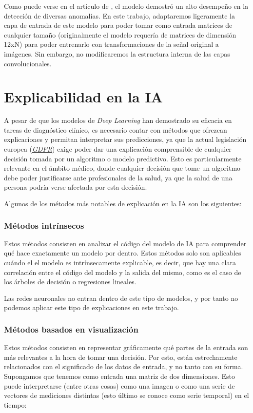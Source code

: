 Como puede verse en el artículo de \cite{ribeiro}, el modelo demostró un alto desempeño en la detección de diversas anomalías. En este trabajo, adaptaremos ligeramente la capa de entrada de este modelo para poder tomar como entrada matrices de cualquier tamaño (originalmente el modelo requería de matrices de dimensión 12xN) para poder entrenarlo con transformaciones de la señal original a imágenes. Sin embargo, no modificaremos la estructura interna de las capas convolucionales.

\section{Explicabilidad en la IA}
A pesar de que los modelos de \emph{Deep Learning} han demostrado su eficacia en tareas de diagnóstico clínico, es necesario contar con métodos que ofrezcan explicaciones y permitan interpretar sus predicciones, ya que la actual legislación europea (\href{https://europa.eu/youreurope/business/dealing-with-customers/data-protection/data-protection-gdpr/index_es.htm}{\emph{GDPR}}) exige poder dar una explicación comprensible de cualquier decisión tomada por un algoritmo o modelo predictivo. Esto es particularmente relevante en el ámbito médico, donde cualquier decisión que tome un algoritmo debe poder justificarse ante profesionales de la salud, ya que la salud de una persona podría verse afectada por esta decisión.

Algunos de los métodos más notables de explicación en la IA son los siguientes:

\subsubsection{Métodos intrínsecos}
Estos métodos consisten en analizar el código del modelo de IA para comprender qué hace exactamente un modelo por dentro. Estos métodos solo son aplicables cuándo el el modelo es intrínsecamente explicable, es decir, que hay una clara correlación entre el código del modelo y la salida del mismo, como es el caso de los árboles de decisión o regresiones lineales.

Las redes neuronales no entran dentro de este tipo de modelos, y por tanto no podemos aplicar este tipo de explicaciones en este trabajo.

\subsubsection{Métodos basados en visualización}
Estos métodos consisten en representar gráficamente qué partes de la entrada son más relevantes a la hora de tomar una decisión. Por esto, están estrechamente relacionados con el significado de los datos de entrada, y no tanto con su forma. Supongamos que tenemos como entrada una matriz de dos dimensiones. Esto puede interpretarse (entre otras cosas) como una imagen o como una serie de vectores de mediciones distintas (esto último se conoce como serie temporal) en el tiempo:

